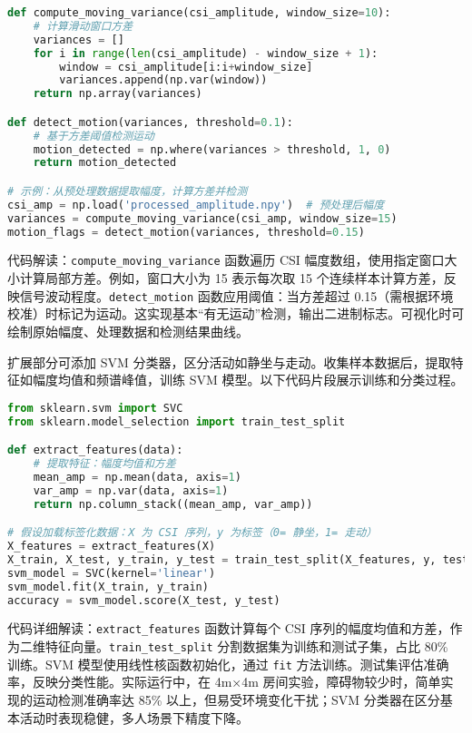 \begin{lstlisting}[language=python]
def compute_moving_variance(csi_amplitude, window_size=10):
    # 计算滑动窗口方差
    variances = []
    for i in range(len(csi_amplitude) - window_size + 1):
        window = csi_amplitude[i:i+window_size]
        variances.append(np.var(window))
    return np.array(variances)

def detect_motion(variances, threshold=0.1):
    # 基于方差阈值检测运动
    motion_detected = np.where(variances > threshold, 1, 0)
    return motion_detected

# 示例：从预处理数据提取幅度，计算方差并检测
csi_amp = np.load('processed_amplitude.npy')  # 预处理后幅度
variances = compute_moving_variance(csi_amp, window_size=15)
motion_flags = detect_motion(variances, threshold=0.15)
\end{lstlisting}
代码解读：\texttt{compute\_{}moving\_{}variance} 函数遍历 CSI 幅度数组，使用指定窗口大小计算局部方差。例如，窗口大小为 15 表示每次取 15 个连续样本计算方差，反映信号波动程度。\texttt{detect\_{}motion} 函数应用阈值：当方差超过 0.15（需根据环境校准）时标记为运动。这实现基本“有无运动”检测，输出二进制标志。可视化时可绘制原始幅度、处理数据和检测结果曲线。\par
扩展部分可添加 SVM 分类器，区分活动如静坐与走动。收集样本数据后，提取特征如幅度均值和频谱峰值，训练 SVM 模型。以下代码片段展示训练和分类过程。\par
\begin{lstlisting}[language=python]
from sklearn.svm import SVC
from sklearn.model_selection import train_test_split

def extract_features(data):
    # 提取特征：幅度均值和方差
    mean_amp = np.mean(data, axis=1)
    var_amp = np.var(data, axis=1)
    return np.column_stack((mean_amp, var_amp))

# 假设加载标签化数据：X 为 CSI 序列，y 为标签（0= 静坐，1= 走动）
X_features = extract_features(X)
X_train, X_test, y_train, y_test = train_test_split(X_features, y, test_size=0.2)
svm_model = SVC(kernel='linear')
svm_model.fit(X_train, y_train)
accuracy = svm_model.score(X_test, y_test)
\end{lstlisting}
代码详细解读：\texttt{extract\_{}features} 函数计算每个 CSI 序列的幅度均值和方差，作为二维特征向量。\texttt{train\_{}test\_{}split} 分割数据集为训练和测试子集，占比 80\%{} 训练。SVM 模型使用线性核函数初始化，通过 \texttt{fit} 方法训练。测试集评估准确率，反映分类性能。实际运行中，在 4m×4m 房间实验，障碍物较少时，简单实现的运动检测准确率达 85\%{} 以上，但易受环境变化干扰；SVM 分类器在区分基本活动时表现稳健，多人场景下精度下降。\par
